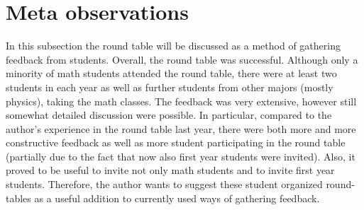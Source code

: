 \section{Meta observations}
\label{sec-4}
\label{subsec:meta}
In this subsection the round table will be discussed as a method of gathering feedback from students.
Overall, the round table was successful. Although only a minority of math students attended the round table, 
there were at least two students in each year as well as further students from other majors (mostly physics), taking the math classes. 
The feedback was very extensive, however still somewhat detailed discussion were possible. 
In particular, compared to the author's experience in the round table last year, 
there were both more and more constructive feedback as well as more student participating in the round table (partially due to the fact that now also first year students were invited).
Also, it proved to be useful to invite not only math students and to invite first year students. 
Therefore, the author wants to suggest these student organized round-tables as a useful addition to currently used ways of gathering feedback.
